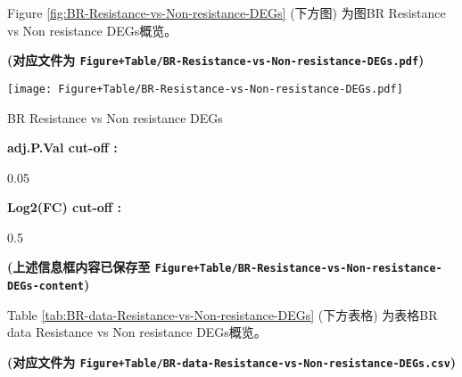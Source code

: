 \documentclass[
]{article}
\begin{document}
Figure \ref{fig:BR-Resistance-vs-Non-resistance-DEGs} (下方图) 为图BR Resistance vs Non resistance DEGs概览。

\textbf{(对应文件为 \texttt{Figure+Table/BR-Resistance-vs-Non-resistance-DEGs.pdf})}

\def\@captype{figure}
\begin{center}
\texttt{[image: Figure+Table/BR-Resistance-vs-Non-resistance-DEGs.pdf]}
\caption{BR Resistance vs Non resistance DEGs}\label{fig:BR-Resistance-vs-Non-resistance-DEGs}
\end{center}
\begin{center}\begin{tcolorbox}[colback=gray!10, colframe=gray!50, width=0.9\linewidth, arc=1mm, boxrule=0.5pt]
\textbf{
adj.P.Val cut-off
:}

\vspace{0.5em}

    0.05

\vspace{2em}


\textbf{
Log2(FC) cut-off
:}

\vspace{0.5em}

    0.5

\vspace{2em}
\end{tcolorbox}
\end{center}

\textbf{(上述信息框内容已保存至 \texttt{Figure+Table/BR-Resistance-vs-Non-resistance-DEGs-content})}

Table \ref{tab:BR-data-Resistance-vs-Non-resistance-DEGs} (下方表格) 为表格BR data Resistance vs Non resistance DEGs概览。

\textbf{(对应文件为 \texttt{Figure+Table/BR-data-Resistance-vs-Non-resistance-DEGs.csv})}
\end{document}

